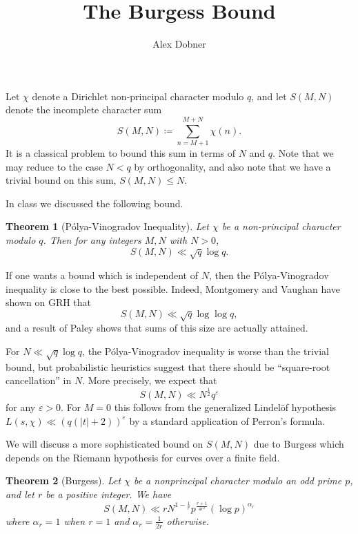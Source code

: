 \documentclass[a4paper,11pt,twoside]{amsart}
\newcommand{\eps}{\varepsilon}
\newtheorem{theorem}{Theorem}
\begin{document}
\title{The Burgess Bound}
\author{Alex Dobner}
\address{Department of Mathematics, UCLA\\
520 Portola Plaza\\
Los Angeles CA 90095}
\maketitle

Let $\chi$ denote a Dirichlet non-principal character modulo $q$, and let $S(M,N)$ denote the incomplete character sum
\[
S(M,N) \coloneqq \sum_{n = M+1}^{M+N} \chi(n).
\]
It is a classical problem to bound this sum in terms of $N$ and $q$. Note that we may reduce to the case $N < q$ by orthogonality, and also note that we have a trivial bound on this sum, $S(M,N) \leq N$.

In class we discussed the following bound.

\begin{theorem}[P\'{o}lya-Vinogradov Inequality]
Let $\chi$ be a non-principal character modulo $q$. Then for any integers $M, N$ with $N > 0$,
\[
S(M,N) \ll \sqrt{q} \log q.
\]
\end{theorem}

If one wants a bound which is independent of $N$, then the P\'{o}lya-Vinogradov inequality is close to the best possible. Indeed, Montgomery and Vaughan have shown on GRH that
\[
S(M,N) \ll \sqrt{q} \log\log q,
\]
and a result of Paley shows that sums of this size are actually attained.

For $N \ll \sqrt{q}\log q$, the P\'{o}lya-Vinogradov inequality is worse than the trivial bound, but probabilistic heuristics suggest that there should be ``square-root cancellation'' in $N$. More precisely, we expect that
\[
S(M,N) \ll N^{\frac{1}{2}} q^{\eps}
\]
for any $\eps > 0$. For $M = 0$ this follows from the generalized Lindel\"{o}f hypothesis $L(s,\chi) \ll (q (|t| + 2))^\eps$ by a standard application of Perron's formula.

We will discuss a more sophisticated bound on $S(M, N)$ due to Burgess which depends on the Riemann hypothesis for curves over a finite field.

\begin{theorem}[Burgess]
Let $\chi$ be a nonprincipal character modulo an odd prime $p$, and let $r$ be a positive integer. We have
\[
S(M,N) \ll r N^{1-\frac{1}{r}} p^{\frac{r+1}{4r^2}} \left(\log p\right)^{\alpha_r}
\]
where $\alpha_r = 1$ when $r = 1$ and $\alpha_r = \frac{1}{2r}$ otherwise.
\end{theorem}
\end{document}
